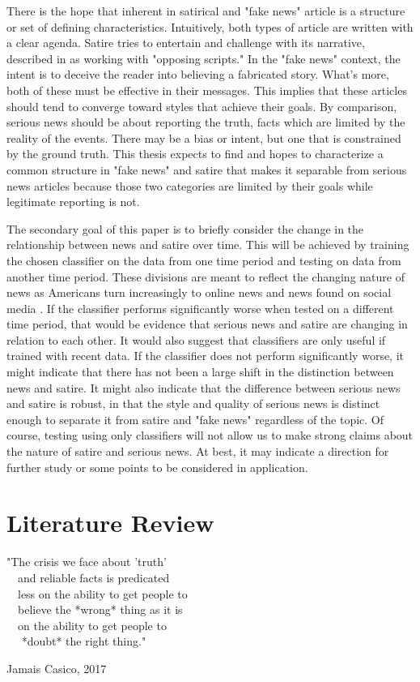 \documentclass [12 pt] {report}
\begin{document}
There is the hope that inherent in satirical and "fake news" article is a structure or set of defining characteristics. Intuitively, both types of article are written with a clear agenda. Satire tries to entertain and challenge with its narrative, described in \cite{fakeNews} as working with "opposing scripts." In the "fake news" context, the intent is to deceive the reader into believing a fabricated story. What's more, both of these must be effective in their messages. This implies that these articles should tend to converge toward styles that achieve their goals. By comparison, serious news should be about reporting the truth, facts which are limited by the reality of the events. There may be a bias or intent, but one that is constrained by the ground truth. This thesis expects to find and hopes to characterize a common structure in "fake news" and satire that makes it separable from serious news articles because those two categories are limited by their goals while legitimate reporting is not.

The secondary goal of this paper is to briefly consider the change in the relationship between news and satire over time. This will be achieved by training the chosen classifier on the data from one time period and testing on data from another time period. These divisions are meant to reflect the changing nature of news as Americans turn increasingly to online news \cite{Gottfried} and news found on social media \cite{Shearer}.  If the classifier performs significantly worse when tested on a different time period, that would be evidence that serious news and satire are changing in relation to each other. It would also suggest that classifiers are only useful if trained with recent data. If the classifier does not perform significantly worse, it might indicate that there has not been a large shift in the distinction between news and satire. It might also indicate that the difference between serious news and satire is robust, in that the style and quality of serious news is distinct enough to separate it from satire and "fake news" regardless of the topic. Of course, testing using only classifiers will not allow us to make strong claims about the nature of satire and serious news. At best, it may indicate a direction for further study or some points to be considered in application.

\chapter{Literature Review}
\singlespacing
\epigraph{"The crisis we face about 'truth'\\ ~~and reliable facts is predicated\\ ~~less on the ability to get people to\\ ~~believe the *wrong* thing as it is\\ ~~on the ability to get people to\\~~ *doubt* the right thing."}{Jamais Casico, 2017}
\onehalfspacing
\end{document}
